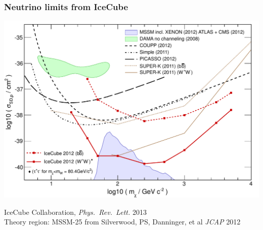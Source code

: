 \documentclass[xcolor=dvipsnames]{beamer}
\begin{document}
\begin{frame}
\frametitle{Neutrino limits from IceCube}

\includegraphics[width=0.8\columnwidth]{fig3}

\tiny IceCube Collaboration, \emph{Phys.\ Rev.\ Lett.} 2013\\
      Theory region: MSSM-25 from Silverwood, PS, Danninger, et al \emph{JCAP} 2012

\end{frame}
\end{document}
